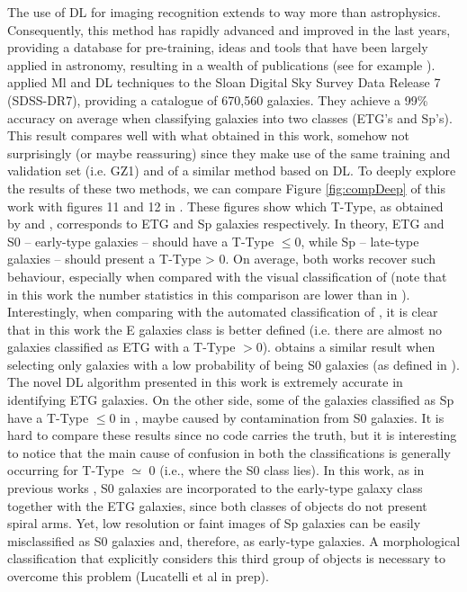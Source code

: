 \documentclass[fleqn,usenatbib]{mnras}
\begin{document}
The use of DL for imaging recognition extends to way more than astrophysics. Consequently, this method has rapidly advanced and improved in the last years, providing a database for pre-training, ideas and tools that have been largely applied in astronomy, resulting in a wealth of publications (see for example \citet{Dominguez2018, Barchi2020,tuccillo2016deep,khalifa2018deep,dieleman2015rotation,zhu2019galaxy,dai2018galaxy}). \citet{Barchi2020} applied Ml and DL techniques to the Sloan Digital Sky Survey Data Release 7 (SDSS-DR7), providing a catalogue of  670,560 galaxies. They achieve a 99\% accuracy on average when classifying galaxies into two classes (ETG's and Sp's). This result compares well with what obtained in this work, somehow not surprisingly (or maybe reassuring) since they make use of the same training and validation set (i.e. GZ1) and of a similar method based on DL. To deeply explore the results of these two methods, we can compare Figure \ref{fig:compDeep}  of this work with figures 11 and 12 in \citet{Barchi2020}. These figures show which T-Type, as obtained by \citet{Dominguez2018} and \citet{Nair2010}, corresponds to ETG and Sp galaxies respectively. In theory, ETG and S0 --  early-type galaxies -- should have a T-Type $\leq 0$, while Sp -- late-type galaxies -- should present a T-Type > 0. On average, both works recover such behaviour, especially when compared with the visual classification of \citet{Nair2010} (note that in this work the number statistics in this comparison are lower than in \citealp{Barchi2020}). Interestingly, when comparing with the automated classification of \citet{Dominguez2018}, it is clear that in this work the E galaxies class is better defined (i.e. there are almost no galaxies classified as ETG with a T-Type $> 0$). \citet{Barchi2020} obtains a similar result when selecting only galaxies with a low probability of being S0 galaxies (as defined in \citet{Dominguez2018}). The novel DL algorithm presented in this work is extremely accurate in identifying ETG galaxies. On the other side, some of the galaxies classified as Sp have a T-Type $\le 0$ in \citet{Dominguez2018}, maybe caused by contamination from S0 galaxies. It is hard to compare these results since no code carries the truth, but it is interesting to notice that the main cause of confusion in both the classifications is generally occurring for T-Type $\simeq$ 0 (i.e., where the S0 class lies). In this work, as in previous works \citep{bamford2009galaxy,lintott2008,lintott2011}, S0 galaxies are incorporated to the early-type galaxy class together with the ETG galaxies, since both classes of objects do not present spiral arms. Yet, low resolution or faint images of Sp galaxies can be easily misclassified as S0 galaxies and, therefore, as early-type galaxies.  A morphological classification that explicitly considers this third group of objects is necessary to overcome this problem (Lucatelli et al in prep).   
\end{document}

